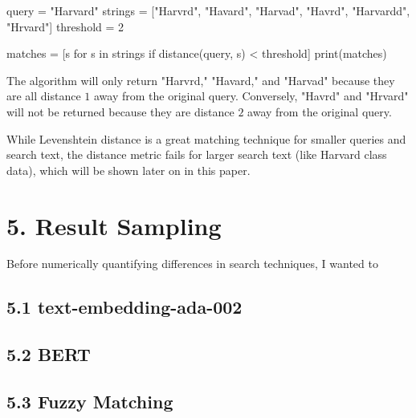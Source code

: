 \documentclass[
	a4paper, %
	10pt, %
	unnumberedsections, %
	twoside, %
]{LTJournalArticle}
\begin{document}
\begin{python}
	query = "Harvard"
	strings = ["Harvrd", "Havard", 
	"Harvad", "Havrd", "Harvardd", "Hrvard"]
	threshold = 2

	matches = [s for s in strings 
	if distance(query, s) < threshold]
	print(matches)
\end{python}

The algorithm will only return "Harvrd," "Havard," and "Harvad" because they are all distance $1$ away from the original query. Conversely, "Havrd" and "Hrvard" will not be returned because they are distance $2$ away from the original query.

While Levenshtein distance is a great matching technique for smaller queries and search text, the distance metric fails for larger search text (like Harvard class data), which will be shown later on in this paper. 

\section{5. Result Sampling}

Before numerically quantifying differences in search techniques, I wanted to 


\subsection{5.1 text-embedding-ada-002}

\subsection{5.2 BERT}

\subsection{5.3 Fuzzy Matching}





\end{document}
